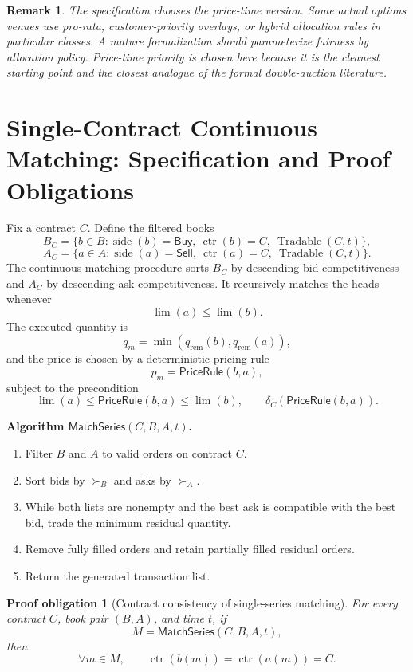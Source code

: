 \documentclass[11pt]{article}
\newtheorem{proofobligation}[definition]{Proof obligation}
\newtheorem{remark}[definition]{Remark}
\newenvironment{algorithmic-description}{\begin{quote}\small}{\end{quote}}
\newcommand{\Buy}{\mathsf{Buy}}
\newcommand{\Sell}{\mathsf{Sell}}
\newcommand{\contract}{\operatorname{ctr}}
\newcommand{\limitp}{\operatorname{lim}}
\newcommand{\side}{\operatorname{side}}
\newcommand{\tradable}{\operatorname{Tradable}}
\begin{document}
\begin{remark}
The specification chooses the price-time version. Some actual options venues use pro-rata, customer-priority overlays, or hybrid allocation rules in particular classes. A mature formalization should parameterize fairness by allocation policy. Price-time priority is chosen here because it is the cleanest starting point and the closest analogue of the formal double-auction literature.
\end{remark}

\section{Single-Contract Continuous Matching: Specification and Proof Obligations}

Fix a contract \(C\). Define the filtered books
\[
B_C=\{b\in B:\side(b)=\Buy,\ \contract(b)=C,\ \tradable(C,t)\},
\]
\[
A_C=\{a\in A:\side(a)=\Sell,\ \contract(a)=C,\ \tradable(C,t)\}.
\]
The continuous matching procedure sorts \(B_C\) by descending bid competitiveness and \(A_C\) by descending ask competitiveness. It recursively matches the heads whenever
\[
\limitp(a)\le \limitp(b).
\]
The executed quantity is
\[
q_m=\min(q_{\mathrm{rem}}(b),q_{\mathrm{rem}}(a)),
\]
and the price is chosen by a deterministic pricing rule
\[
p_m=\mathsf{PriceRule}(b,a),
\]
subject to the precondition
\[
\limitp(a)\le \mathsf{PriceRule}(b,a)\le \limitp(b),
\qquad
\delta_C(\mathsf{PriceRule}(b,a)).
\]

\begin{algorithmic-description}
\textbf{Algorithm \(\mathsf{MatchSeries}(C,B,A,t)\).}
\begin{enumerate}[label=\arabic*.]
  \item Filter \(B\) and \(A\) to valid orders on contract \(C\).
  \item Sort bids by \(\succ_B\) and asks by \(\succ_A\).
  \item While both lists are nonempty and the best ask is compatible with the best bid, trade the minimum residual quantity.
  \item Remove fully filled orders and retain partially filled residual orders.
  \item Return the generated transaction list.
\end{enumerate}
\end{algorithmic-description}

\begin{proofobligation}[Contract consistency of single-series matching]
For every contract \(C\), book pair \((B,A)\), and time \(t\), if
\[
M=\mathsf{MatchSeries}(C,B,A,t),
\]
then
\[
\forall m\in M,
\qquad
\contract(b(m))=\contract(a(m))=C.
\]
\end{proofobligation}
\end{document}
